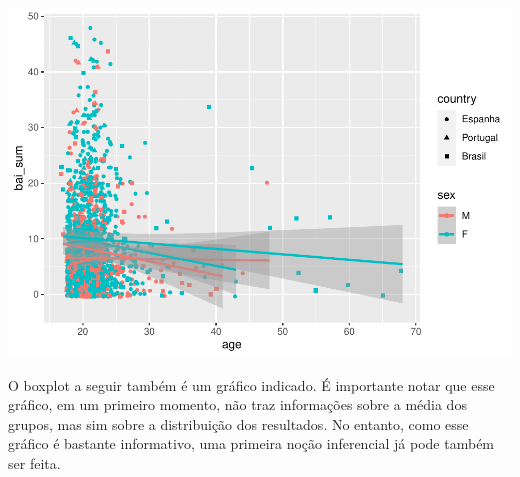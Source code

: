 \documentclass[
]{book}
\newenvironment{Shaded}{\begin{snugshade}}{\end{snugshade}}
\newcommand{\DataTypeTok}[1]{\textcolor[rgb]{0.13,0.29,0.53}{#1}}
\newcommand{\FloatTok}[1]{\textcolor[rgb]{0.00,0.00,0.81}{#1}}
\newcommand{\KeywordTok}[1]{\textcolor[rgb]{0.13,0.29,0.53}{\textbf{#1}}}
\newcommand{\NormalTok}[1]{#1}
\newcommand{\OperatorTok}[1]{\textcolor[rgb]{0.81,0.36,0.00}{\textbf{#1}}}
\newcommand{\StringTok}[1]{\textcolor[rgb]{0.31,0.60,0.02}{#1}}
\begin{document}
\begin{Shaded}
\end{Shaded}

\begin{center}\includegraphics{gitbook-demo_files/figure-latex/unnamed-chunk-27-1} \end{center}

O boxplot a seguir também é um gráfico indicado. É importante notar que
esse gráfico, em um primeiro momento, não traz informações sobre a média
dos grupos, mas sim sobre a distribuição dos resultados. No entanto,
como esse gráfico é bastante informativo, uma primeira noção inferencial
já pode também ser feita.

\begin{Shaded}
\end{Shaded}
\end{document}

